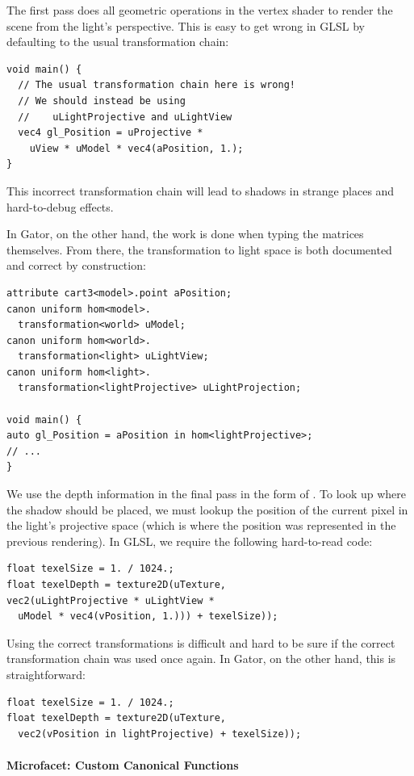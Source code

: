 \documentclass[../main.tex]{subfiles}
\begin{document}
{The first pass does all geometric operations in the vertex shader to render the scene from the light's perspective.  This is easy to get wrong in GLSL by defaulting to the usual transformation chain:
%
\begin{lstlisting}
void main() {
  // The usual transformation chain here is wrong!
  // We should instead be using 
  //    uLightProjective and uLightView
  vec4 gl_Position = uProjective * 
    uView * uModel * vec4(aPosition, 1.);
}
\end{lstlisting}
%
This incorrect transformation chain will lead to shadows in strange places and hard-to-debug effects.

In Gator, on the other hand, the work is done when typing the matrices themselves.  From there, the transformation to light space is both documented and correct by construction:
%
\begin{lstlisting}
attribute cart3<model>.point aPosition;
canon uniform hom<model>.
  transformation<world> uModel;
canon uniform hom<world>.
  transformation<light> uLightView;
canon uniform hom<light>.
  transformation<lightProjective> uLightProjection;

void main() {
auto gl_Position = aPosition in hom<lightProjective>;
// ...
}
\end{lstlisting}
We use the depth information in the final pass in the form of .  To look up where the shadow should be placed, we must lookup the position of the current pixel in the light's projective space (which is where the position was represented in the previous rendering).
In GLSL, we require the following hard-to-read code:
\begin{lstlisting}
float texelSize = 1. / 1024.;
float texelDepth = texture2D(uTexture, 
vec2(uLightProjective * uLightView * 
  uModel * vec4(vPosition, 1.))) + texelSize));
\end{lstlisting}
Using the correct transformations is difficult and hard to be sure if the correct transformation chain was used once again.  In Gator, on the other hand, this is straightforward:
\begin{lstlisting}
float texelSize = 1. / 1024.;
float texelDepth = texture2D(uTexture, 
  vec2(vPosition in lightProjective) + texelSize));
\end{lstlisting}

\paragraph{Microfacet: Custom Canonical Functions}

}
\end{document}
